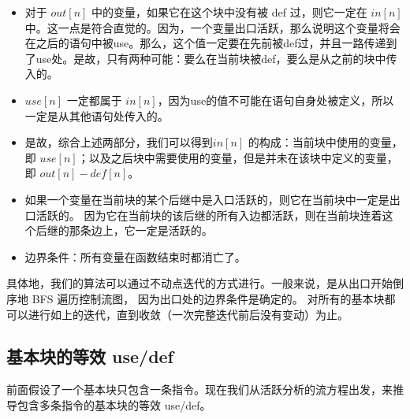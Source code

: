 \begin{itemize}

\item 对于 $\mathit{out}[n]$ 中的变量，如果它在这个块中没有被 def 过，则它一定在 $\mathit{in}[n]$ 中。这一点是符合直觉的。因为，一个变量出口活跃，那么说明这个变量将会在之后的语句中被use。那么，这个值一定要在先前被def过，并且一路传递到了use处。是故，只有两种可能：要么在当前块被def，要么是从之前的块中传入的。

\item $\mathit{use}[n]$ 一定都属于 $\mathit{in}[n]$，因为use的值不可能在语句自身处被定义，所以一定是从其他语句处传入的。

\item 是故，综合上述两部分，我们可以得到$\mathit{in}[n]$ 的构成：当前块中使用的变量，即 $\mathit{use}[n]$；以及之后块中需要使用的变量，但是并未在该块中定义的变量，即 $\mathit{out}[n] - \mathit{def}[n]$。

\item 如果一个变量在当前块的某个后继中是入口活跃的，则它在当前块中一定是出口活跃的。
因为它在当前块的该后继的所有入边都活跃，则在当前块连着这个后继的那条边上，它一定是活跃的。

\item 边界条件：所有变量在函数结束时都消亡了。
\end{itemize}

具体地，我们的算法可以通过不动点迭代的方式进行。一般来说，是从出口开始倒序地 BFS 遍历控制流图，
因为出口处的边界条件是确定的。
对所有的基本块都可以进行如上的迭代，直到收敛（一次完整迭代前后没有变动）为止。

\subsection{基本块的等效 use/def}

前面假设了一个基本块只包含一条指令。现在我们从活跃分析的流方程出发，来推导包含多条指令的基本块的等效 use/def。

